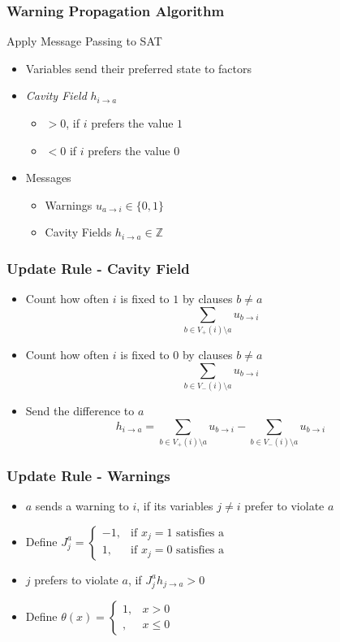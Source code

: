 \begin{frame}
	\frametitle{Warning Propagation Algorithm}
	Apply Message Passing to SAT
	\begin{itemize}
		\item Variables send their preferred state to factors
		\item \emph{Cavity Field} $h_{i \rightarrow a}$
		\begin{itemize}
		\item $>0$, if $i$ prefers the value $1$    \item $<0$ if $i$ prefers the value $0$
		\end{itemize}
		\item Messages
			\begin{itemize}
				\item Warnings $u_{a \rightarrow i} \in \{0, 1\}$
				\item Cavity Fields $h_{i \rightarrow a} \in \mathbb{Z}$
			\end{itemize}
	\end{itemize}
\end{frame}

\begin{frame}
	\frametitle{Update Rule - Cavity Field}
	
	\begin{itemize}
		\item Count how often $i$ is fixed to $1$ by clauses $b \neq a$
			$$ \sum_{b \in V_+(i) \setminus a} u_{b \rightarrow i}$$	
		\item Count how often $i$ is fixed to $0$ by clauses $b \neq a$
			$$ \sum_{b \in V_-(i) \setminus a} u_{b \rightarrow i}$$	
		\item Send the difference to $a$
			$$ h_{i \rightarrow a} = \sum_{b \in V_+(i) \setminus a} u_{b \rightarrow i} - \sum_{b \in V_-(i) \setminus a} u_{b \rightarrow i}$$
	\end{itemize}
\end{frame}

\begin{frame}
	\frametitle{Update Rule - Warnings}
	
	\begin{itemize}
		\item $a$ sends a warning to $i$, if its variables $j \neq i$ prefer to violate $a$
		\item Define $J_j^a = \begin{cases}
      -1, & \text{if } x_j = 1 \text{ satisfies a}  \\
      1, & \text{if } x_j = 0 \text{ satisfies a}
    \end{cases}$ 
    \item $j$ prefers to violate $a$, if $J_j^a h_{j \rightarrow a} > 0$ 
    \item Define $\theta(x) = \begin{cases}
      1, & x > 0  \\
      , & x \leq 0
    \end{cases}$
	\end{itemize}
\end{frame}


